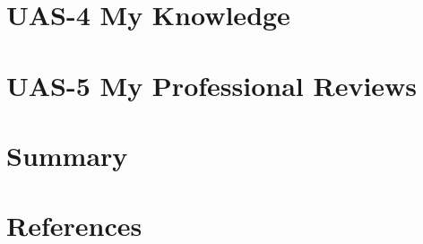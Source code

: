 \documentclass[
  letterpaper,
  DIV=11,
  numbers=noendperiod]{scrreprt}
\begin{document}

\chapter{UAS-4 My Knowledge}\label{uas-4-my-knowledge}


\chapter{UAS-5 My Professional
Reviews}\label{uas-5-my-professional-reviews}


\chapter{Summary}\label{summary}


\chapter*{References}\label{references}


\label{refs}
\end{document}

